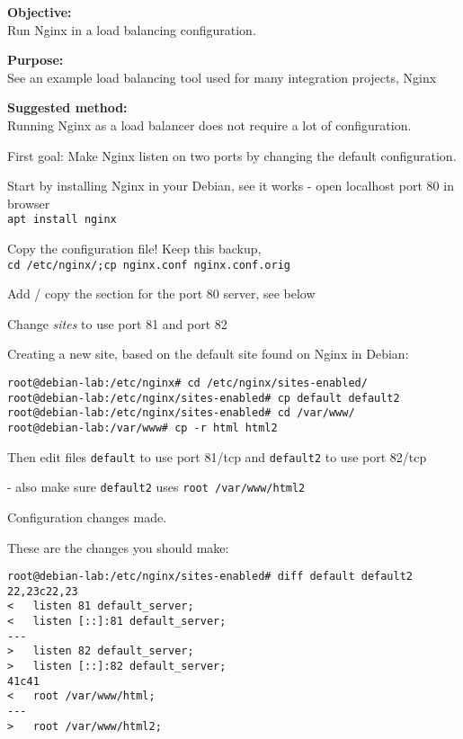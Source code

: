 \documentclass[a4paper,11pt,notitlepage]{report}
\begin{document}
{\bf Objective:}\\
Run Nginx in a load balancing configuration.

{\bf Purpose:}\\
See an example load balancing tool used for many integration projects, Nginx

{\bf Suggested method:}\\
Running Nginx as a load balancer does not require a lot of configuration.

First goal: Make Nginx listen on two ports by changing the default configuration.

\begin{list2}
\item Start by installing Nginx in your Debian, see it works - open localhost port 80 in browser\\
\verb+apt install nginx+
\item Copy the configuration file! Keep this backup,\\
\verb+cd /etc/nginx/;cp nginx.conf nginx.conf.orig+
\item Add / copy the section for the port 80 server, see below
\item Change \emph{sites} to use port 81 and port 82
\end{list2}


Creating a new site, based on the default site found on Nginx in Debian:
\begin{verbatim}
root@debian-lab:/etc/nginx# cd /etc/nginx/sites-enabled/
root@debian-lab:/etc/nginx/sites-enabled# cp default default2
root@debian-lab:/etc/nginx/sites-enabled# cd /var/www/
root@debian-lab:/var/www# cp -r html html2
\end{verbatim}

Then edit files \verb+default+ to use port 81/tcp and \verb+default2+ to use port 82/tcp

- also make sure \verb+default2+ uses \verb+root /var/www/html2+

Configuration changes made.

These are the changes you should make:
\begin{verbatim}
root@debian-lab:/etc/nginx/sites-enabled# diff default default2
22,23c22,23
< 	listen 81 default_server;
< 	listen [::]:81 default_server;
---
> 	listen 82 default_server;
> 	listen [::]:82 default_server;
41c41
< 	root /var/www/html;
---
> 	root /var/www/html2;
\end{verbatim}
\end{document}
